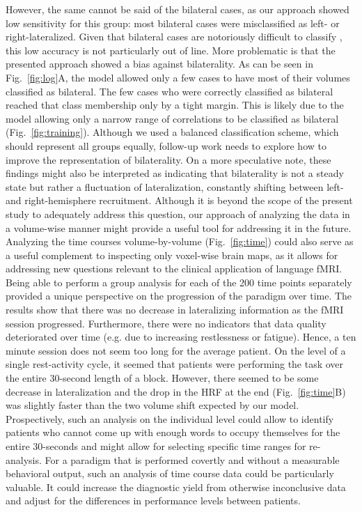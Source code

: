 \documentclass[fleqn,10pt]{SelfArx} %
\begin{document}
However, the same cannot be said of the bilateral cases, as our approach showed low sensitivity for this group: most bilateral cases were misclassified as left- or right-lateralized. Given that bilateral cases are notoriously difficult to classify \citep{Rutten_2002, Benke_2006, Arora_2009, Janecek_2013}, this low accuracy is not particularly out of line. More problematic is that the presented approach showed a bias against bilaterality. As can be seen in Fig.~\ref{fig:log}A, the model allowed only a few cases to have most of their volumes classified as bilateral. The few cases who were correctly classified as bilateral reached that class membership only by a tight margin. This is likely due to the model allowing only a narrow range of correlations to be classified as bilateral (Fig.~\ref{fig:training}). Although we used a balanced classification scheme, which should represent all groups equally, follow-up work needs to explore how to improve the representation of bilaterality. On a more speculative note, these findings might also be interpreted as indicating that bilaterality is not a steady state but rather a fluctuation of lateralization, constantly shifting between left- and right-hemisphere recruitment. Although it is beyond the scope of the present study to adequately address this question, our approach of analyzing the data in a volume-wise manner might provide a useful tool for addressing it in the future.\\
Analyzing the time courses volume-by-volume (Fig.~\ref{fig:time}) could also serve as a useful complement to inspecting only voxel-wise brain maps, as it allows for addressing new questions relevant to the clinical application of language fMRI. Being able to perform a group analysis for each of the 200 time points separately provided a unique perspective on the progression of the paradigm over time. The results show that there was no decrease in lateralizing information as the fMRI session progressed. Furthermore, there were no indicators that data quality deteriorated over time (e.g. due to increasing restlessness or fatigue). Hence, a ten minute session does not seem too long for the average patient. On the level of a single rest-activity cycle, it seemed that patients were performing the task over the entire 30-second length of a block. However, there seemed to be some decrease in lateralization and the drop in the HRF at the end (Fig.~\ref{fig:time}B) was slightly faster than the two volume shift expected by our model. Prospectively, such an analysis on the individual level could allow to identify patients who cannot come up with enough words to occupy themselves for the entire 30-seconds and might allow for selecting specific time ranges for re-analysis. For a paradigm that is performed covertly and without a measurable behavioral output, such an analysis of time course data could be particularly valuable. It could increase the diagnostic yield from otherwise inconclusive data and adjust for the differences in performance levels between patients.\\
\end{document}
